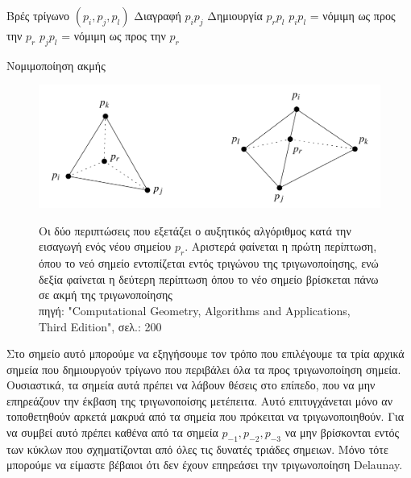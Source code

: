 \documentclass[oneside,12pt]{book}
\newenvironment{matlab}
	{\begin{figure}[hp]\centering\captionsetup{justification=centering}}
	{\end{figure}}
\theoremstyle{definition}
\begin{document}
\begin{algorithm}[H]
	\SetAlgoLined
	
	Βρές τρίγωνο \((p_i, p_j, p_l)\) \;
	{Διαγραφή \(p_i p_j\) \;
	Δημιουργία \(p_r p_l\) \;
	\(p_i p_l\) = νόμιμη ως προς την \(p_r\) \;
	\(p_j p_l\) = νόμιμη ως προς την \(p_r\) \;}
	
	\caption{Νομιμοποίηση ακμής}
\end{algorithm}

\begin{matlab}
	\includegraphics[scale=0.3]{images/incremental.png}
	\caption{Οι δύο περιπτώσεις που εξετάζει ο αυξητικός αλγόριθμος κατά την εισαγωγή ενός νέου σημείου \(p_r\). Αριστερά φαίνεται η πρώτη περίπτωση, όπου το νεό σημείο εντοπίζεται εντός τριγώνου της τριγωνοποίησης, ενώ δεξία φαίνεται η δεύτερη περίπτωση όπου το νέο σημείο βρίσκεται πάνω σε ακμή της τριγωνοποίησης \\ πηγή: "Computational Geometry, Algorithms and Applications, Third Edition", σελ.: 200}
\end{matlab} 

Στο σημείο αυτό μπορούμε να εξηγήσουμε τον τρόπο που επιλέγουμε τα τρία αρχικά σημεία που δημιουργούν τρίγωνο που περιβάλει όλα τα προς τριγωνοποίηση σημεία. Ουσιαστικά, τα σημεία αυτά πρέπει να λάβουν θέσεις στο επίπεδο, που να μην επηρεάζουν την έκβαση της τριγωνοποίσης μετέπειτα. Αυτό επιτυγχάνεται μόνο αν τοποθετηθούν αρκετά μακρυά από τα σημεία που πρόκειται να τριγωνοποιηθούν. Για να συμβεί αυτό πρέπει καθένα από τα σημεία \(p_{-1}, p_{-2}, p_{-3}\) να μην βρίσκονται εντός των κύκλων που σχηματίζονται από όλες τις δυνατές τριάδες σημειων. Μόνο τότε μπορούμε να είμαστε βέβαιοι ότι δεν έχουν επηρεάσει την τριγωνοποίηση Delaunay. \\
\end{document}
